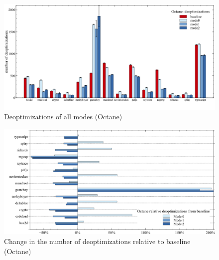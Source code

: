 \begin{figure}[ht]
  \begin{center}
    \centering
    \includegraphics[width=1.0\textwidth]{figures/octane_deopt.png}
    \caption{Deoptimizations of all modes (Octane)} 
    \label{f:octane_deopt}
  \end{center}
\end{figure}
\begin{figure}[ht]
  \begin{center}
    \centering
    \includegraphics[width=1.0\textwidth]{figures/octane_variation_deopt.png}
    \caption{Change in the number of deoptimizations relative to baseline (Octane)}
    \label{f:octane_variation_deopt}
  \end{center}
\end{figure}
\clearpage
